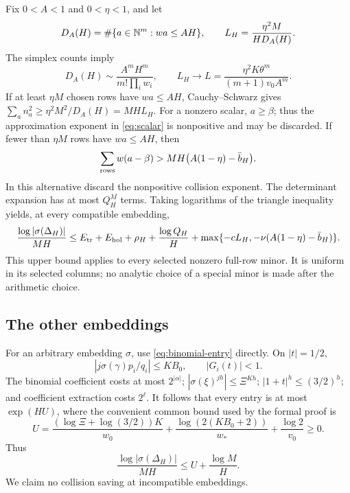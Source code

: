 Fix \(0<A<1\) and \(0<\eta<1\), and let
\[
 D_A(H)=\#\{a\in\mathbb N^m:wa\le AH\},\qquad
 L_H=\frac{\eta^2M}{H D_A(H)}.
\]
The simplex counts imply
\begin{equation}\label{eq:collision-limit}
 D_A(H)\sim\frac{A^mH^m}{m!\prod_iw_i},\qquad
 L_H\longrightarrow
 L=\frac{\eta^2K\theta^m}{(m+1)v_0A^m}.
\end{equation}
If at least \(\eta M\) chosen rows have \(wa\le AH\),
Cauchy--Schwarz gives
\(\sum_a n_a^2\ge\eta^2M^2/D_A(H)=MH L_H\).
For a nonzero scalar, \(a\ge\beta\); thus the approximation
exponent in \eqref{eq:scalar} is nonpositive and may be discarded.
If fewer than \(\eta M\) rows have \(wa\le AH\), then
\[
 \sum_{\rm rows}w(a-\beta)>
 MH\bigl(A(1-\eta)-\bar b_H\bigr).
\]
In this alternative discard the nonpositive collision exponent.
The determinant expansion has at most \(Q_H^M\) terms.
Taking logarithms of the triangle inequality yields, at every
compatible embedding,
\begin{equation}\label{eq:good-bound}
 \frac{\log|\sigma(\Delta_H)|}{MH}
 \le E_{\rm tr}+E_{\rm hol}
     +\rho_H+\frac{\log Q_H}{H}
     +\max\{-cL_H,-\nu(A(1-\eta)-\bar b_H)\}.
\end{equation}
This upper bound applies to every selected nonzero full-row minor.
It is uniform in its selected columns; no analytic choice of a special
minor is made after the arithmetic choice.

\subsection{The other embeddings}

For an arbitrary embedding \(\sigma\), use
\eqref{eq:binomial-entry} directly. On \(|t|=1/2\),
\[
 |j\sigma(\gamma)p_i/q_i|\le KB_0,\qquad |G_i(t)|<1.
\]
The binomial coefficient costs at most \(2^{|\alpha|}\);
\(|\sigma(\xi)^{jh}|\le\Xi^{Kh}\);
\(|1+t|^h\le(3/2)^h\); and coefficient extraction costs \(2^\ell\).
It follows that every entry is at most \(\exp(HU)\), where the
convenient common bound used by the formal proof is
\begin{equation}\label{eq:direct-error}
 U=\frac{(\log\Xi+\log(3/2))K}{w_0}
       +\frac{\log(2(KB_0+2))}{w_*}
       +\frac{\log2}{v_0}\ge0.
\end{equation}
Thus
\begin{equation}\label{eq:other-bound}
 \frac{\log|\sigma(\Delta_H)|}{MH}\le U+\frac{\log M}{H}.
\end{equation}
We claim no collision saving at incompatible embeddings.


